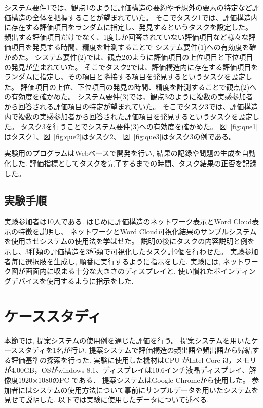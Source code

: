 \documentclass[syuuron]{kuee}
\begin{document}
			システム要件1では、観点1のように評価構造の要約や予想外の要素の特定など評価構造の全体を把握することが望まれていた。
			そこでタスク1では、評価構造内に存在する評価項目をランダムに指定し、発見するというタスクを設定した。
			頻出する評価項目だけでなく、1度しか回答されていない評価項目など様々な評価項目を発見する時間、精度を計測することで
			システム要件(1)への有効度を確かめた。
			システム要件(2)では、観点2のように評価項目の上位項目と下位項目の発見が望まれていた。
			そこでタスク2では、評価構造内に存在する評価項目をランダムに指定し、その項目と隣接する項目を発見するというタスクを設定した。
			評価項目の上位、下位項目の発見の時間、精度を計測することで観点(2)への有効度を確かめた。
			システム要件(3)では、観点3のように複数の実感参加者から回答される評価項目の特定が望まれていた。
			そこでタスク3では、評価構造内で複数の実感参加者から回答された評価項目を発見するというタスクを設定した。
			タスク3を行うことでシステム要件(3)への有効度を確かめた。
			図~\ref{fig:que1}はタスク1、図~\ref{fig:que2}はタスク2、
			図~\ref{fig:que3}はタスク3の例である。
			
			実験用のプログラムはWebベースで開発を行い, 結果の記録や問題の生成を自動化した. 
			評価指標としてタスクを完了するまでの時間、タスク結果の正否を記録した。
		
		\subsection{実験手順}
			実験参加者は10人である. 
			はじめに評価構造のネットワーク表示とWord Cloud表示の特徴を説明し、
			ネットワークとWord Cloud可視化結果のサンプルシステムを使用させシステムの使用法を学ばせた。
			説明の後にタスクの内容説明と例を示し、3種類の評価構造を3種類で可視化したタスク計9個を行わせた。
			実験参加者毎に選択肢を生成し, 順番に実行するように指示をした. 
			実験には, ネットワーク図が画面内に収まる十分な大きさのディスプレイと. 使い慣れたポインティングデバイスを使用するように指示をした. 
		
	\section{ケーススタディ}
		本節では, 提案システムの使用例を通じた評価を行う。
		提案システムを用いたケーススタディを1名が行い, 提案システムで評価構造の頻出語や頻出語から帰結する評価基準の探索を行った. 
		実験に使用した機材はCPU がIntel Core i3，メモリが4.00GB，OSがwindows 8.1、ディスプレイは10.6インチ液晶ディスプレイ、解像度1920×1080のPC である．
		提案システムはGoogle Chromeから使用した。
		参加者にはシステムの使用方法について事前にサンプルデータを用いたシステムを見せて説明した. 以下では実験に使用したデータについて述べる. 
		
\end{document}
